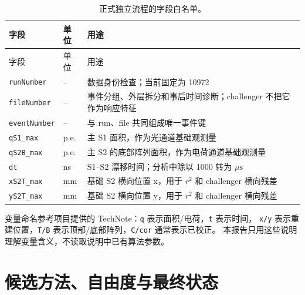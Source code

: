 \documentclass[UTF8,12pt,a4paper,oneside,fontset=none]{ctexart}
\numberwithin{equation}{section}
\begin{document}
\begin{longtable}{p{3.4cm} p{2.0cm} p{6.2cm}}
\caption{正式独立流程的字段白名单。}
\label{tab:variables}\\
\toprule
字段 & 单位 & 用途 \\
\midrule
\endfirsthead
\toprule
字段 & 单位 & 用途 \\
\midrule
\endhead
\texttt{runNumber} & -- & 数据身份检查；当前固定为 10972 \\
\texttt{fileNumber} & -- & 事件分组、外层拆分和事后时间诊断；challenger 不把它作为响应特征 \\
\texttt{eventNumber} & -- & 与 run、file 共同组成唯一事件键 \\
\texttt{qS1\_max} & p.e. & 主 S1 面积，作为光通道基础观测量 \\
\texttt{qS2B\_max} & p.e. & 主 S2 的底部阵列面积，作为电荷通道基础观测量 \\
\texttt{dt} & ns & S1--S2 漂移时间；分析中除以 1000 转为 \(\mu\mathrm s\) \\
\texttt{xS2T\_max} & mm & 基础 S2 横向位置 x，用于 \(r^2\) 和 challenger 横向残差 \\
\texttt{yS2T\_max} & mm & 基础 S2 横向位置 y，用于 \(r^2\) 和 challenger 横向残差 \\
\bottomrule
\end{longtable}

变量命名参考项目提供的 TechNote\cite{technote}：\texttt{q} 表示面积/电荷，\texttt{t} 表示时间，
\texttt{x/y} 表示重建位置，\texttt{T/B} 表示顶部/底部阵列，\texttt{C/cor} 通常表示已校正。
本报告只用这些说明理解变量含义，不读取说明中已有算法参数。

\clearpage
\section{候选方法、自由度与最终状态}
\end{document}
